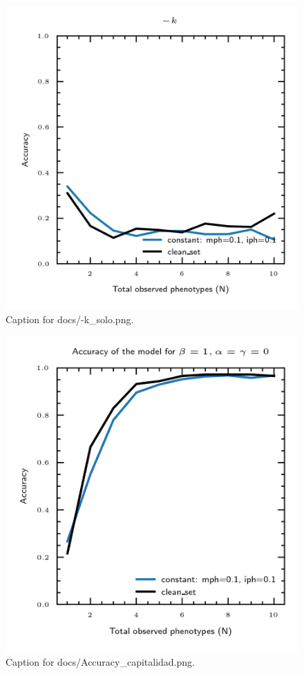 \documentclass{article}
\begin{document}
\begin{figure}[h] \centering \includegraphics{docs/-k_solo.png} \caption{Caption for docs/-k_solo.png.} \end{figure}
\begin{figure}[h] \centering \includegraphics{docs/Accuracy_capitalidad.png} \caption{Caption for docs/Accuracy_capitalidad.png.} \end{figure}
\end{document}
